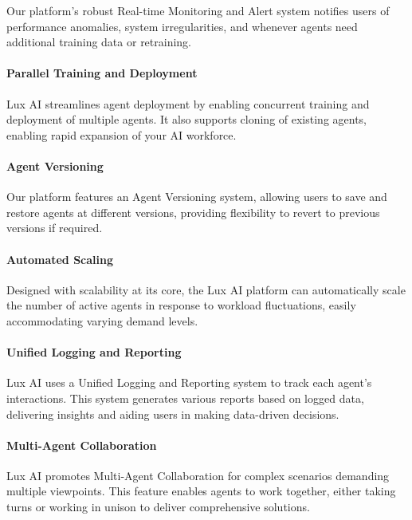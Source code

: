 \documentclass[11pt]{article}
\begin{document}
Our platform's robust Real-time Monitoring and Alert system notifies users of performance anomalies, system irregularities, and whenever agents need additional training data or retraining.


\paragraph{Parallel Training and Deployment}

Lux AI streamlines agent deployment by enabling concurrent training and deployment of multiple agents. It also supports cloning of existing agents, enabling rapid expansion of your AI workforce.


\paragraph{Agent Versioning}

Our platform features an Agent Versioning system, allowing users to save and restore agents at different versions, providing flexibility to revert to previous versions if required.


\paragraph{Automated Scaling}

Designed with scalability at its core, the Lux AI platform can automatically scale the number of active agents in response to workload fluctuations, easily accommodating varying demand levels.


\paragraph{Unified Logging and Reporting}

Lux AI uses a Unified Logging and Reporting system to track each agent's interactions. This system generates various reports based on logged data, delivering insights and aiding users in making data-driven decisions.


\paragraph{Multi-Agent Collaboration}

Lux AI promotes Multi-Agent Collaboration for complex scenarios demanding multiple viewpoints. This feature enables agents to work together, either taking turns or working in unison to deliver comprehensive solutions.
\end{document}
